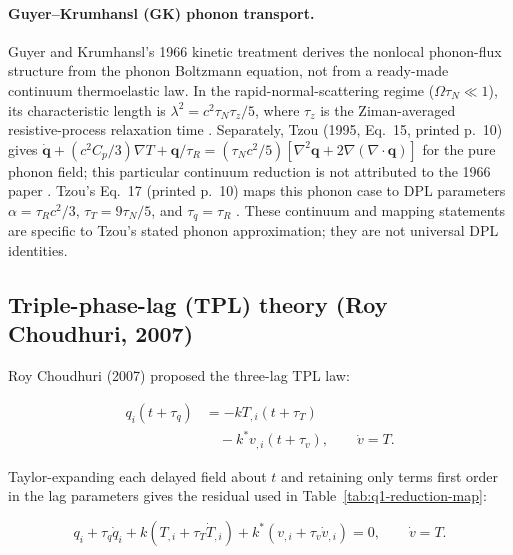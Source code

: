 \paragraph{Guyer--Krumhansl (GK) phonon transport.}

Guyer and Krumhansl's 1966 kinetic treatment derives the nonlocal phonon-flux structure from the phonon Boltzmann equation, not from a ready-made continuum thermoelastic law. In the rapid-normal-scattering regime ($\Omega\tau_N\ll1$), its characteristic length is $\lambda^2=c^2\tau_N\tau_z/5$, where $\tau_z$ is the Ziman-averaged resistive-process relaxation time \cite{GuyerKrumhansl1966}. Separately, Tzou (1995, Eq.~15, printed p.~10) gives $\dot{\bm q}+(c^2C_p/3)\nabla T+\bm q/\tau_R=(\tau_Nc^2/5)[\nabla^2\bm q+2\nabla(\nabla\cdot\bm q)]$ for the pure phonon field; this particular continuum reduction is not attributed to the 1966 paper \cite{Tzou1995}. Tzou's Eq.~17 (printed p.~10) maps this phonon case to DPL parameters $\alpha=\tau_Rc^2/3$, $\tau_T=9\tau_N/5$, and $\tau_q=\tau_R$ \cite{Tzou1995}. These continuum and mapping statements are specific to Tzou's stated phonon approximation; they are not universal DPL identities.

\subsection{Triple-phase-lag (TPL) theory (Roy Choudhuri, 2007)}
\label{sec:4.8}

Roy Choudhuri (2007) \cite{RoyChoudhuri2007} proposed the three-lag TPL law:

\begin{equation}
\begin{aligned}
q_i(t+\tau_q) &= -kT_{,i}(t+\tau_T)\\
&\quad - k^*v_{,i}(t+\tau_v), \qquad \dot v=T.
\end{aligned}
\label{eq:4.17}
\end{equation}

Taylor-expanding each delayed field about $t$ and retaining only terms first order in the lag parameters gives the residual used in Table~\ref{tab:q1-reduction-map}:

\begin{equation*}
q_i+\tau_q\dot q_i+k\left(T_{,i}+\tau_T\dot T_{,i}\right)
+k^*\left(v_{,i}+\tau_v\dot v_{,i}\right)=0,
\qquad \dot v=T.
\end{equation*}

